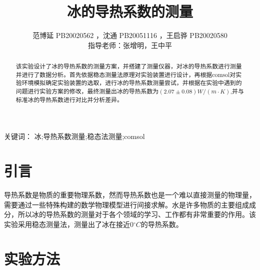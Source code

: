 \documentclass{article}
\title{\songti \zihao{2}\bfseries 冰的导热系数的测量}
\author{范博延 PB20020562 ，沈通 PB20051116 ，王启骅 PB20020580\\指导老师：张增明，王中平}
\begin{document}
	\maketitle
	\begin{abstract}
		\kaishu{}\quad 该实验设计了冰的导热系数的测量方案，并搭建了测量仪器，对冰的导热系数进行测量并进行了数据分析。首先依据稳态测量法原理对实验装置进行设计，再根据comsol对实验环境模拟确定实验装置的选取，进行冰的导热系数测量尝试，并根据在实验中遇到的问题进行实验方案的修改，最终测量出冰的导热系数为$ (2.07\pm0.08 )W/(m\cdot K)  $,并与标准冰的导热系数进行对比并分析差异。
	    
		
	\end{abstract}
        \hspace{1.4cm}\heiti{}\quad 关键词：
        \kaishu{}冰;导热系数测量;稳态法测量;comsol
    \section{引言}
    \songti{}导热系数是物质的重要物理系数，然而导热系数也是一个难以直接测量的物理量，需要通过一些特殊构建的数学物理模型进行间接求解。水是许多物质的主要组成成分，所以冰的导热系数的测量对于各个领域的学习、工作都有非常重要的作用。该实验采用稳态测量法，测量出了冰在接近0$ ^{\circ}C $的导热系数。
    \section{实验方法}
\end{document}
